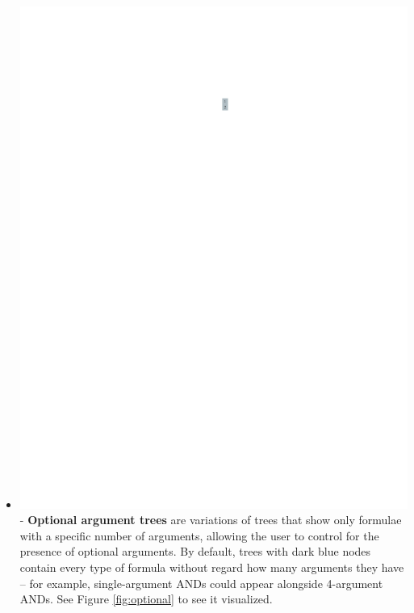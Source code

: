 \documentclass[conference]{IEEEtran}
\begin{document}
\begin{itemize}
		\item  \vspace{.25cm} \includegraphics[scale=.75]{glossary-lightblue} -
		\textbf{Optional argument trees} are variations of trees that show only
		formulae with a specific number of arguments, allowing the user to control for
		the presence of optional arguments. By default, trees with dark blue nodes
		contain every type of formula without regard how many arguments they have --
		for example, single-argument ANDs could appear alongside 4-argument ANDs. See
		Figure \ref{fig:optional} to see it visualized. \end{itemize}
	
\end{document}
